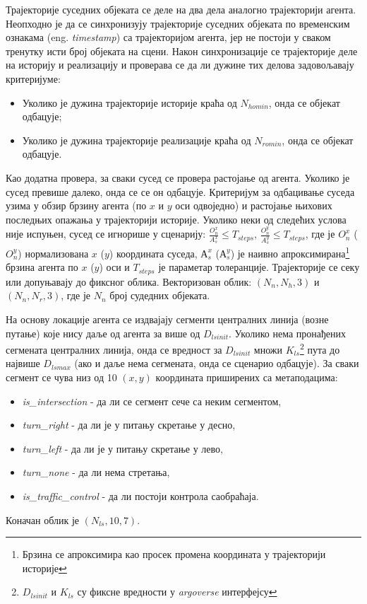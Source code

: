 \documentclass[11pt,oneside]{memoir}
\begin{document}
Трајекторије суседних објеката се деле на два дела аналогно трајекторији агента. Неопходно је да се синхронизују трајекторије 
суседних објеката по временским ознакама (eng. \textit{timestamp}) са трајекторијом агента, јер не постоји у сваком тренутку исти
број објеката на сцени. Након синхронизације се трајекторије деле на историју и реализацију и проверава се да ли дужине тих
делова задовољавају критеријуме:
\begin{itemize}
  \item Уколико је дужина трајекторије историје краћа од $N_{homin}$, онда се објекат одбацује;
  \item Уколико је дужина трајекторије реализације краћа од $N_{romin}$, онда се објекат одбацује.
\end{itemize}
Као додатна провера, за сваки сусед се провера растојање од агента. Уколико је сусед превише далеко, онда се се он одбацује.
Критеријум за одбацивање суседа узима у обзир брзину агента (по $x$ и $y$ оси одвоједно) и растојање њихових последњих опажања
у трајекторији историје. Уколико неки од следећих услова није
испуњен, сусед се игнорише у сценарију: $\frac{O_n^x}{A_s^x} \leq T_{steps}$, $\frac{O_n^y}{A_s^y} \leq T_{steps}$,
где је $O_n^x$ ($O_n^y$) нормализована $x$ ($y$) координата суседа, $А_s^x$ ($А_s^y$) је наивно 
апроксимирана\footnote{Брзина се апроксимира као просек промена координата у трајекторији историје} брзина агента
по $x$ ($y$) оси и $T_{steps}$ је параметар толеранције.
Трајекторије се секу или допуњавају до фиксног облика. Векторизован облик: $(N_n, N_h, 3)$ и $(N_n, N_r, 3)$, где је $N_n$ број
судедних објеката. 

На основу локације агента се издвајају сегменти централних линија (возне путање) које нису даље од агента за више од $D_{lsinit}$. Уколико нема
пронађених сегмената централних линија, онда се вредност за $D_{lsinit}$ множи $K_{ls}$\footnote{$D_{lsinit}$ и $K_{ls}$ су фиксне вредности
у \textit{argoverse} интерфејсу} 
пута до највише $D_{lsmax}$ (ако и даље нема сегмената, 
онда се сценарио одбацује). За сваки сегмент се чува низ од 10 $(x, y)$ координата приширених са метаподацима:
\begin{itemize} 
  \item \textit{is\_intersection} - да ли се сегмент сече са неким сегментом,
  \item \textit{turn\_right} - да ли је у питању скретање у десно, 
  \item \textit{turn\_left} - да ли је у питању скретање у лево, 
  \item \textit{turn\_none} - да ли нема стретања, 
  \item \textit{is\_traffic\_control} - да ли постоји контрола саобраћаја. 
\end{itemize}
Коначан облик је $(N_{ls}, 10, 7)$. 
\end{document}

